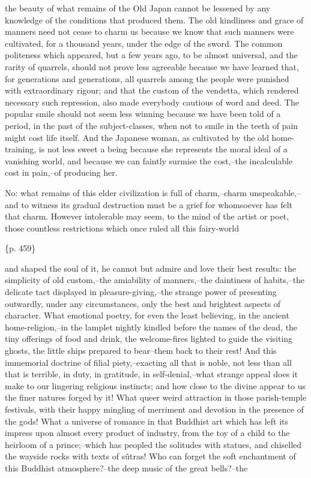 the beauty of what remains of the Old Japan cannot be lessened by any knowledge of the conditions that produced them. The old kindliness and grace of manners need not cease to charm us because we know that such manners were cultivated, for a thousand years, under the edge of the sword. The common politeness which appeared, but a few years ago, to be almost universal, and the rarity of quarrels, should not prove less agreeable because we have learned that, for generations and generations, all quarrels among the people were punished with extraordinary rigour; and that the custom of the vendetta, which rendered necessary such repression, also made everybody cautious of word and deed. The popular smile should not seem less winning because we have been told of a period, in the past of the subject-classes, when not to smile in the teeth of pain might cost life itself. And the Japanese woman, as cultivated by the old home-training, is not less sweet a being because she represents the moral ideal of a vanishing world, and because we can faintly surmise the cost,--the incalculable cost in pain,--of producing her.

No: what remains of this elder civilization is full of charm,--charm unspeakable,--and to witness its gradual destruction must be a grief for whomsoever has felt that charm. However intolerable may seem, to the mind of the artist or poet, those countless restrictions which once ruled all this fairy-world

\{p. 459\}

and shaped the soul of it, he cannot but admire and love their best results: the simplicity of old custom,--the amiability of manners,--the daintiness of habits,--the delicate tact displayed in pleasure-giving,--the strange power of presenting outwardly, under any circumstances, only the best and brightest aspects of character. What emotional poetry, for even the least believing, in the ancient home-religion,--in the lamplet nightly kindled before the names of the dead, the tiny offerings of food and drink, the welcome-fires lighted to guide the visiting ghosts, the little ships prepared to bear--them back to their rest! And this immemorial doctrine of filial piety,--exacting all that is noble, not less than all that is terrible, in duty, in gratitude, in self-denial,--what strange appeal does it make to our lingering religious instincts; and how close to the divine appear to us the finer natures forged by it! What queer weird attraction in those parish-temple festivals, with their happy mingling of merriment and devotion in the presence of the gods! What a universe of romance in that Buddhist art which has left its impress upon almost every product of industry, from the toy of a child to the heirloom of a prince;--which has peopled the solitudes with statues, and chiselled the wayside rocks with texts of sûtras! Who can forget the soft enchantment of this Buddhist atmosphere?--the deep music of the great bells?--the

